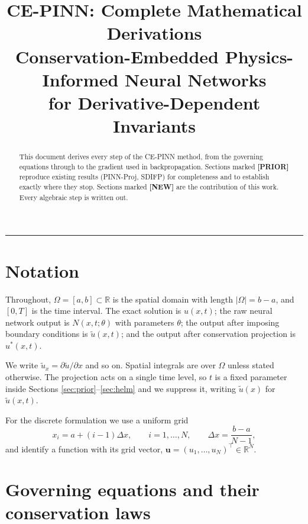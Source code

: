 \documentclass[11pt,a4paper]{article}
\title{\textbf{CE-PINN: Complete Mathematical Derivations}\\[0.4em]
\large Conservation-Embedded Physics-Informed Neural Networks\\
\large for Derivative-Dependent Invariants}
\author{}
\date{}
\theoremstyle{remark}
\newcommand{\R}{\mathbb{R}}
\newcommand{\ut}{\tilde{u}}
\newcommand{\us}{u^{*}}
\newcommand{\Om}{\Omega}
\begin{document}
\maketitle

\begin{abstract}
\noindent
This document derives every step of the CE-PINN method, from the governing
equations through to the gradient used in backpropagation. Sections marked
\textbf{[PRIOR]} reproduce existing results (PINN-Proj, SDIFP) for completeness
and to establish exactly where they stop. Sections marked \textbf{[NEW]} are the
contribution of this work. Every algebraic step is written out.
\end{abstract}

\tableofcontents

\bigskip\hrule\bigskip

\section{Notation}

Throughout, $\Om = [a,b] \subset \R$ is the spatial domain with length
$|\Om| = b-a$, and $[0,T]$ is the time interval. The exact solution is $u(x,t)$;
the raw neural network output is $N(x,t;\theta)$ with parameters $\theta$; the
output after imposing boundary conditions is $\ut(x,t)$; and the output after
conservation projection is $\us(x,t)$.

We write $\ut_x = \partial \ut/\partial x$ and so on. Spatial integrals are over
$\Om$ unless stated otherwise. The projection acts on a single time level, so
$t$ is a fixed parameter inside Sections \ref{sec:prior}--\ref{sec:helm} and we
suppress it, writing $\ut(x)$ for $\ut(x,t)$.

For the discrete formulation we use a uniform grid
\begin{equation}
x_i = a + (i-1)\Delta x, \qquad i = 1,\dots,N, \qquad
\Delta x = \frac{b-a}{N-1},
\end{equation}
and identify a function with its grid vector, $\bm{u} = (u_1,\dots,u_N)^\top \in \R^N$.

\section{Governing equations and their conservation laws}
\end{document}
